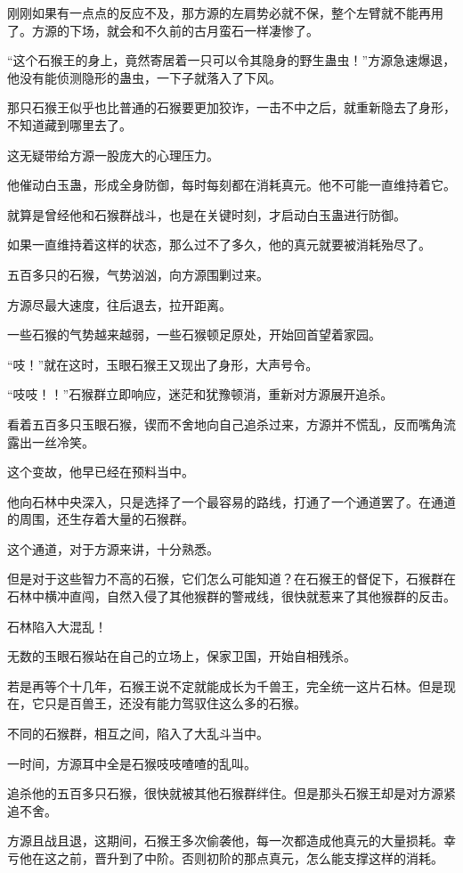 \begin{this_body}
刚刚如果有一点点的反应不及，那方源的左肩势必就不保，整个左臂就不能再用了。方源的下场，就会和不久前的古月蛮石一样凄惨了。

“这个石猴王的身上，竟然寄居着一只可以令其隐身的野生蛊虫！”方源急速爆退，他没有能侦测隐形的蛊虫，一下子就落入了下风。

那只石猴王似乎也比普通的石猴要更加狡诈，一击不中之后，就重新隐去了身形，不知道藏到哪里去了。

这无疑带给方源一股庞大的心理压力。

他催动白玉蛊，形成全身防御，每时每刻都在消耗真元。他不可能一直维持着它。

就算是曾经他和石猴群战斗，也是在关键时刻，才启动白玉蛊进行防御。

如果一直维持着这样的状态，那么过不了多久，他的真元就要被消耗殆尽了。

五百多只的石猴，气势汹汹，向方源围剿过来。

方源尽最大速度，往后退去，拉开距离。

一些石猴的气势越来越弱，一些石猴顿足原处，开始回首望着家园。

“吱！”就在这时，玉眼石猴王又现出了身形，大声号令。

“吱吱！！”石猴群立即响应，迷茫和犹豫顿消，重新对方源展开追杀。

看着五百多只玉眼石猴，锲而不舍地向自己追杀过来，方源并不慌乱，反而嘴角流露出一丝冷笑。

这个变故，他早已经在预料当中。

他向石林中央深入，只是选择了一个最容易的路线，打通了一个通道罢了。在通道的周围，还生存着大量的石猴群。

这个通道，对于方源来讲，十分熟悉。

但是对于这些智力不高的石猴，它们怎么可能知道？在石猴王的督促下，石猴群在石林中横冲直闯，自然入侵了其他猴群的警戒线，很快就惹来了其他猴群的反击。

石林陷入大混乱！

无数的玉眼石猴站在自己的立场上，保家卫国，开始自相残杀。

若是再等个十几年，石猴王说不定就能成长为千兽王，完全统一这片石林。但是现在，它只是百兽王，还没有能力驾驭住这么多的石猴。

不同的石猴群，相互之间，陷入了大乱斗当中。

一时间，方源耳中全是石猴吱吱喳喳的乱叫。

追杀他的五百多只石猴，很快就被其他石猴群绊住。但是那头石猴王却是对方源紧追不舍。

方源且战且退，这期间，石猴王多次偷袭他，每一次都造成他真元的大量损耗。幸亏他在这之前，晋升到了中阶。否则初阶的那点真元，怎么能支撑这样的消耗。


\end{this_body}

